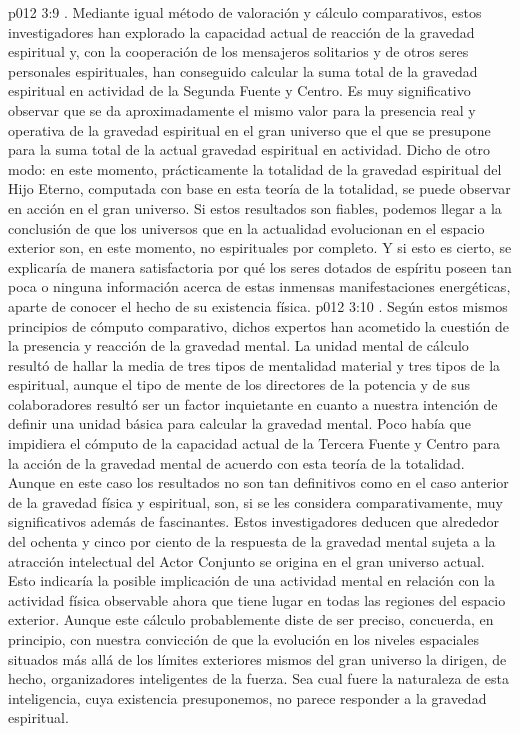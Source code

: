 \vs p012 3:9 . Mediante igual método de valoración y cálculo comparativos, estos investigadores han explorado la capacidad actual de reacción de la gravedad espiritual y, con la cooperación de los mensajeros solitarios y de otros seres personales espirituales, han conseguido calcular la suma total de la gravedad espiritual en actividad de la Segunda Fuente y Centro. Es muy significativo observar que se da aproximadamente el mismo valor para la presencia real y operativa de la gravedad espiritual en el gran universo que el que se presupone para la suma total de la actual gravedad espiritual en actividad. Dicho de otro modo: en este momento, prácticamente la totalidad de la gravedad espiritual del Hijo Eterno, computada con base en esta teoría de la totalidad, se puede observar en acción en el gran universo. Si estos resultados son fiables, podemos llegar a la conclusión de que los universos que en la actualidad evolucionan en el espacio exterior son, en este momento, no espirituales por completo. Y si esto es cierto, se explicaría de manera satisfactoria por qué los seres dotados de espíritu poseen tan poca o ninguna información acerca de estas inmensas manifestaciones energéticas, aparte de conocer el hecho de su existencia física.
\vs p012 3:10 . Según estos mismos principios de cómputo comparativo, dichos expertos han acometido la cuestión de la presencia y reacción de la gravedad mental. La unidad mental de cálculo resultó de hallar la media de tres tipos de mentalidad material y tres tipos de la espiritual, aunque el tipo de mente de los directores de la potencia y de sus colaboradores resultó ser un factor inquietante en cuanto a nuestra intención de definir una unidad básica para calcular la gravedad mental. Poco había que impidiera el cómputo de la capacidad actual de la Tercera Fuente y Centro para la acción de la gravedad mental de acuerdo con esta teoría de la totalidad. Aunque en este caso los resultados no son tan definitivos como en el caso anterior de la gravedad física y espiritual, son, si se les considera comparativamente, muy significativos además de fascinantes. Estos investigadores deducen que alrededor del ochenta y cinco por ciento de la respuesta de la gravedad mental sujeta a la atracción intelectual del Actor Conjunto se origina en el gran universo actual. Esto indicaría la posible implicación de una actividad mental en relación con la actividad física observable ahora que tiene lugar en todas las regiones del espacio exterior. Aunque este cálculo probablemente diste de ser preciso, concuerda, en principio, con nuestra convicción de que la evolución en los niveles espaciales situados más allá de los límites exteriores mismos del gran universo la dirigen, de hecho, organizadores inteligentes de la fuerza. Sea cual fuere la naturaleza de esta inteligencia, cuya existencia presuponemos, no parece responder a la gravedad espiritual.
